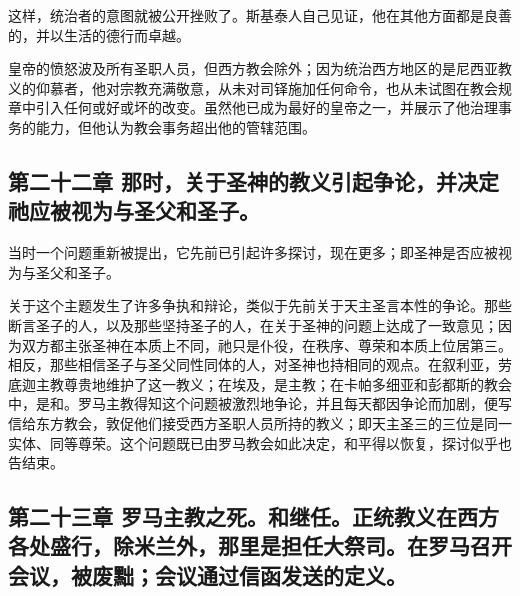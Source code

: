 这样，统治者的意图就被公开挫败了。斯基泰人自己见证，他在其他方面都是良善的，并以生活的德行而卓越。\par

皇帝的愤怒波及所有圣职人员，但西方教会除外；因为统治西方地区的是尼西亚教义的仰慕者，他对宗教充满敬意，从未对司铎施加任何命令，也从未试图在教会规章中引入任何或好或坏的改变。虽然他已成为最好的皇帝之一，并展示了他治理事务的能力，但他认为教会事务超出他的管辖范围。\par


\subsection{第二十二章 那时，关于圣神的教义引起争论，并决定祂应被视为与圣父和圣子。}

当时一个问题重新被提出，它先前已引起许多探讨，现在更多；即圣神是否应被视为与圣父和圣子。\par

关于这个主题发生了许多争执和辩论，类似于先前关于天主圣言本性的争论。那些断言圣子的人，以及那些坚持圣子的人，在关于圣神的问题上达成了一致意见；因为双方都主张圣神在本质上不同，祂只是仆役，在秩序、尊荣和本质上位居第三。相反，那些相信圣子与圣父同性同体的人，对圣神也持相同的观点。在叙利亚，劳底迦主教尊贵地维护了这一教义；在埃及，是主教；在卡帕多细亚和彭都斯的教会中，是和。罗马主教得知这个问题被激烈地争论，并且每天都因争论而加剧，便写信给东方教会，敦促他们接受西方圣职人员所持的教义；即天主圣三的三位是同一实体、同等尊荣。这个问题既已由罗马教会如此决定，和平得以恢复，探讨似乎也告结束。\par


\subsection{第二十三章 罗马主教之死。和继任。正统教义在西方各处盛行，除米兰外，那里是担任大祭司。在罗马召开会议，被废黜；会议通过信函发送的定义。}

